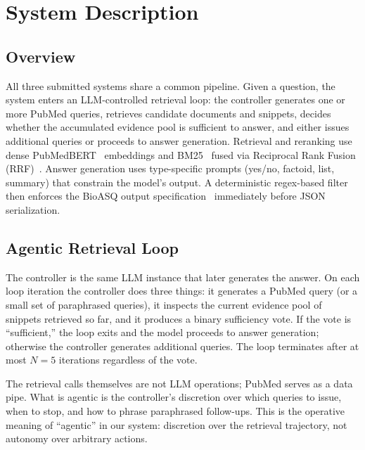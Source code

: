 \documentclass[sigconf,natbib=true]{ceurart}
\begin{document}
\section{System Description}
\label{sec:system}

\subsection{Overview}

All three submitted systems share a common pipeline. Given a question, the system enters an LLM-controlled retrieval loop: the controller generates one or more PubMed queries, retrieves candidate documents and snippets, decides whether the accumulated evidence pool is sufficient to answer, and either issues additional queries or proceeds to answer generation. Retrieval and reranking use dense PubMedBERT~\cite{pubmedbert} embeddings and BM25~\cite{robertson2009bm25} fused via Reciprocal Rank Fusion (RRF)~\cite{rrf2009}. Answer generation uses type-specific prompts (yes/no, factoid, list, summary) that constrain the model's output. A deterministic regex-based filter then enforces the BioASQ output specification~\cite{bioasq5format} immediately before JSON serialization.

\subsection{Agentic Retrieval Loop}

The controller is the same LLM instance that later generates the answer. On each loop iteration the controller does three things: it generates a PubMed query (or a small set of paraphrased queries), it inspects the current evidence pool of snippets retrieved so far, and it produces a binary sufficiency vote. If the vote is ``sufficient,'' the loop exits and the model proceeds to answer generation; otherwise the controller generates additional queries. The loop terminates after at most $N{=}5$ iterations regardless of the vote.

The retrieval calls themselves are not LLM operations; PubMed serves as a data pipe. What is agentic is the controller's discretion over which queries to issue, when to stop, and how to phrase paraphrased follow-ups. This is the operative meaning of ``agentic'' in our system: discretion over the retrieval trajectory, not autonomy over arbitrary actions.
\end{document}
